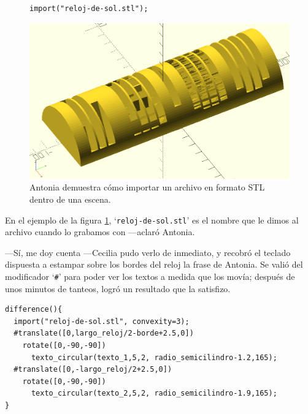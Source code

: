 \begin{figure}[ht]
\begin{minipage}[]{.5\textwidth}%
 \begin{lstlisting}[numbers=none]
import("reloj-de-sol.stl");
\end{lstlisting}%
\end{minipage}\hfill
\begin{minipage}[]{.46\textwidth}%
  \centering
  \includegraphics[width=\iftoggle{libro}{.75}{1}\textwidth]{imagenes/reloj-de-sol-import}
\end{minipage}
\caption{Antonia demuestra cómo importar un archivo en formato
  \textsc{STL} dentro de una escena.}
  \label{fig:reloj-de-sol-import}
\end{figure}


\guillemotright En el ejemplo de la figura
\ref{fig:reloj-de-sol-import}, `\texttt{reloj-de-sol.stl}' es el
nombre que le dimos al archivo cuando lo grabamos con 
---a\-cla\-ró Antonia.

---Sí, me doy cuenta ---Cecilia pudo verlo de inmediato, y recobró el
teclado dispuesta a estampar sobre los bordes del reloj la frase de
Antonia. Se valió del modificador `\lstinline!#!' para poder ver los
textos a medida que los movía; después de unos minutos de tanteos,
logró un resultado que la satisfizo.

\begin{lstlisting}
difference(){
  import("reloj-de-sol.stl", convexity=3);
  #translate([0,largo_reloj/2-borde+2.5,0])
    rotate([0,-90,-90])
      texto_circular(texto_1,5,2, radio_semicilindro-1.2,165);
  #translate([0,-largo_reloj/2+2.5,0])
    rotate([0,-90,-90])
      texto_circular(texto_2,5,2, radio_semicilindro-1.9,165); 
}
\end{lstlisting}


